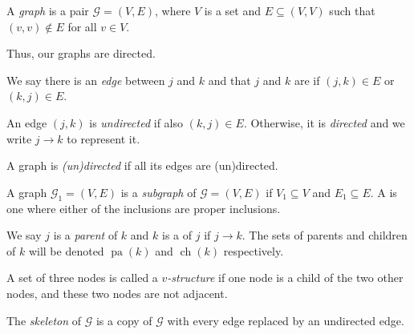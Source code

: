 \documentclass[a4paper]{article}
\DeclareMathOperator\pa{pa}
\DeclareMathOperator\child{ch}
\begin{document}
\begin{defi}[Graph]
  A \emph{graph} is a pair $\mathcal{G} = (V, E)$, where $V$ is a set and $E \subseteq (V, V)$ such that $(v, v) \not \in E$ for all $v \in V$. %
\end{defi}
Thus, our graphs are directed.

\begin{defi}[Edge]
  We say there is an \emph{edge} between $j$ and $k$ and that $j$ and $k$ are  if $(j, k) \in E$ or $(k, j) \in E$.
\end{defi}

\begin{defi}
  An edge $(j, k)$ is \emph{undirected} if also $(k, j) \in E$. Otherwise, it is \emph{directed} and we write $j \to k$ to represent it.
\end{defi}

\begin{defi}
  A graph is \emph{(un)directed} if all its edges are (un)directed.
\end{defi}

\begin{defi}[Subgraph]
  A graph $\mathcal{G}_1 = (V, E)$ is a \emph{subgraph} of $\mathcal{G} = (V, E)$ if $V_1 \subseteq V$ and $E_1 \subseteq E$. A  is one where either of the inclusions are proper inclusions.
\end{defi}

\begin{defi}
  We say $j$ is a \emph{parent} of $k$ and $k$ is a  of $j$ if $j \to k$. The sets of parents and children of $k$ will be denoted $\pa(k)$ and $\child(k)$ respectively. %
\end{defi}

\begin{defi}[$v$-structure]
  A set of three nodes is called a \emph{$v$-structure} if one node is a child of the two other nodes, and these two nodes are not adjacent.
\end{defi}

\begin{defi}[Skeleton]
  The \emph{skeleton} of $\mathcal{G}$ is a copy of $\mathcal{G}$ with every edge replaced by an undirected edge.
\end{defi}
\end{document}
